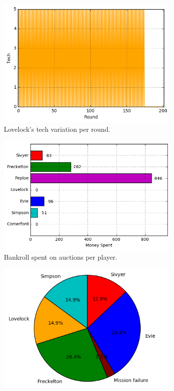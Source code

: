 \documentclass[11pt, twoside]{article}
\begin{document}
\begin{figure}[b!]
	\centering
	\begin{subfigure}[b]{0.49\textwidth}
		\includegraphics[width=\textwidth]{normgame_t7.png}
		\caption{Lovelock's tech variation per round.}
	\end{subfigure}
	\begin{subfigure}[b]{0.49\textwidth}
		\includegraphics[width=\textwidth]{normgame_aspent.png}
		\caption{Bankroll spent on auctions per player.}
	\end{subfigure}
	\begin{subfigure}[b]{0.39\textwidth}
		\includegraphics[width=\textwidth]{normgame_amined.png}

\end{subfigure}
\end{figure}
\end{document}
